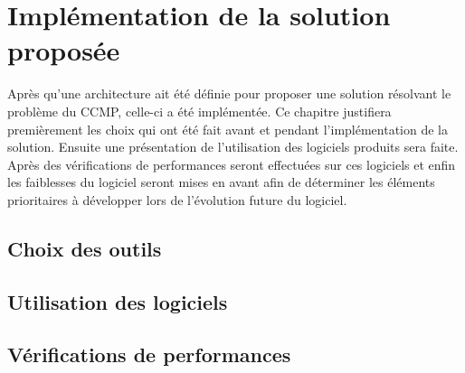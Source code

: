 \chapter{Implémentation de la solution proposée}
\renewcommand{\leftmark}{\thechapter.~~Implémentation de la solution proposée}
Après qu'une architecture ait été définie pour proposer une solution
résolvant le problème du CCMP, celle-ci a été implémentée. Ce chapitre
justifiera premièrement les choix qui ont été fait avant et pendant
l'implémentation de la solution. Ensuite une présentation de l'utilisation
des logiciels produits sera faite. Après des vérifications de performances
seront effectuées sur ces logiciels et enfin les faiblesses du logiciel
seront mises en avant afin de déterminer les éléments prioritaires
à développer lors de l'évolution future du logiciel.

\section{Choix des outils}

\section{Utilisation des logiciels}

\section{Vérifications de performances}
